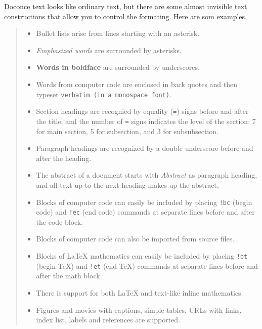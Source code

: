 \documentclass[a4paper]{article}
\begin{document}
Doconce text looks like ordinary text, but there are some almost invisible
text constructions that allow you to control the formating. Here are
som examples.
%
\begin{quote}
%
\begin{itemize}

\item Bullet lists arise from lines starting with an asterisk.

\item \emph{Emphasized words} are surrounded by asterisks.

\item \textbf{Words in boldface} are surrounded by underscores.

\item Words from computer code are enclosed in back quotes and
then typeset \texttt{verbatim (in a monospace font)}.

\item Section headings are recognied by equality (\texttt{=}) signs before
and after the title, and the number of \texttt{=} signs indicates the
level of the section: 7 for main section, 5 for subsection, and
3 for subsubsection.

\item Paragraph headings are recognized by a double underscore
before and after the heading.

\item The abstract of a document starts with \emph{Abstract} as paragraph
heading, and all text up to the next heading makes up the abstract,

\item Blocks of computer code can easily be included by placing
\texttt{!bc} (begin code) and \texttt{!ec} (end code) commands at separate lines
before and after the code block.

\item Blocks of computer code can also be imported from source files.

\item Blocks of LaTeX mathematics can easily be included by placing
\texttt{!bt} (begin TeX) and \texttt{!et} (end TeX) commands at separate lines
before and after the math block.

\item There is support for both LaTeX and text-like inline mathematics.

\item Figures and movies with captions, simple tables,
URLs with links, index list, labels and references are supported.


\end{itemize}
\end{quote}
\end{document}
